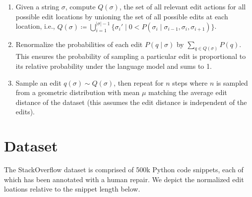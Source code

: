 \documentclass[sigplan,review,anonymous,acmsmall]{acmart}\settopmatter{printfolios=false,printccs=false,printacmref=false}
\begin{document}
  \begin{enumerate}
    \item Given a string $\sigma$, compute $Q(\sigma)$, the set of all relevant edit actions for all possible edit locations by unioning the set of all possible edits at each location, i.e., $Q(\sigma) \coloneqq \bigcup_{i=1}^{|\sigma| - 1} \big\{\sigma_i' \mid  0 < P(\sigma_i \mid \sigma_{i-1}, \sigma_i, \sigma_{i+1})\big\}$.
    \item Renormalize the probabilities of each edit $P(q \mid \sigma)$ by $\sum_{q \in Q(\sigma)} P(q)$. This ensures the probability of sampling a particular edit is proportional to its relative probability under the language model and sums to 1.
    \item Sample an edit $q(\sigma) \sim Q(\sigma)$, then repeat for $n$ steps where $n$ is sampled from a geometric distribution with mean $\mu$ matching the average edit distance of the dataset (this assumes the edit distance is independent of the edits).
  \end{enumerate}

  \pagebreak\section{Dataset}

  The StackOverflow dataset is comprised of 500k Python code snippets, each of which has been annotated with a human repair. We depict the normalized edit loations relative to the snippet length below.

  \begin{figure}
  \end{figure}
\end{document}
